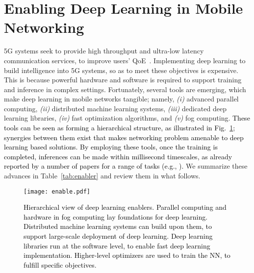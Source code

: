 \documentclass[journal,comsoc,letter]{IEEEtran}
\newcommand{\edit}[1]{\textcolor{black}{#1}}
\begin{document}
\section{Enabling Deep Learning in Mobile Networking}\label{sec:stimulator}
5G systems seek to provide high throughput and ultra-low latency communication services, to improve users' QoE~\cite{agiwal2016next}. Implementing deep learning to build intelligence into 5G systems, so as to meet these objectives is expensive. This is because powerful hardware and software is required to support training and inference in complex settings. Fortunately, several tools are emerging, which make deep learning in mobile networks tangible; namely, \emph{(i)} advanced parallel computing, \emph{(ii)} distributed machine learning systems,  \emph{(iii)} dedicated deep learning libraries, \emph{(iv)} fast optimization algorithms, and \emph{(v)} fog computing. \edit{These tools can be seen as forming a hierarchical structure, as illustrated in Fig.~\ref{fig:enable}; synergies between them exist that makes networking problem amenable to deep learning based solutions. By employing these tools, once the training is completed, inferences can be made within millisecond timescales, as already reported by a number of papers for a range of tasks (e.g., \cite{zhang2016deep3, ordonez2016deep, de2016distributed} ).} We summarize these advances in Table~\ref{tab:enabler} and review them in what follows.
\begin{figure}[htb]
\begin{center}
\texttt{[image: enable.pdf]}
\end{center}
\caption{\label{fig:enable} \edit{Hierarchical view of deep learning enablers. Parallel computing and hardware in fog computing lay foundations for deep learning. Distributed machine learning systems can build upon them, to support large-scale deployment of deep learning. Deep learning libraries run at the software level, to enable fast deep learning implementation. Higher-level optimizers are used to train the NN, to fulfill specific objectives.}}
\end{figure}
\end{document}
